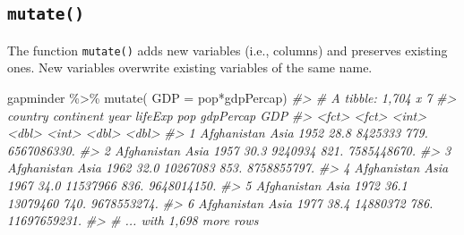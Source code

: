 \documentclass[
]{book}
\newenvironment{Shaded}{\begin{snugshade}}{\end{snugshade}}
\newcommand{\AttributeTok}[1]{\textcolor[rgb]{0.77,0.63,0.00}{#1}}
\newcommand{\CommentTok}[1]{\textcolor[rgb]{0.56,0.35,0.01}{\textit{#1}}}
\newcommand{\FunctionTok}[1]{\textcolor[rgb]{0.00,0.00,0.00}{#1}}
\newcommand{\NormalTok}[1]{#1}
\newcommand{\SpecialCharTok}[1]{\textcolor[rgb]{0.00,0.00,0.00}{#1}}
\begin{document}
\hypertarget{mutate}{%
\subsection*{\texorpdfstring{\texttt{mutate()}}{mutate()}}\label{mutate}}

The function \texttt{mutate()} adds new variables (i.e., columns) and preserves existing ones.
New variables overwrite existing variables of the same name.

\begin{Shaded}
\begin{Highlighting}[]
\NormalTok{gapminder }\SpecialCharTok{\%\textgreater{}\%} \FunctionTok{mutate}\NormalTok{( }\AttributeTok{GDP =}\NormalTok{ pop}\SpecialCharTok{*}\NormalTok{gdpPercap)}
\CommentTok{\#\textgreater{} \# A tibble: 1,704 x 7}
\CommentTok{\#\textgreater{}   country     continent  year lifeExp      pop gdpPercap          GDP}
\CommentTok{\#\textgreater{}   \textless{}fct\textgreater{}       \textless{}fct\textgreater{}     \textless{}int\textgreater{}   \textless{}dbl\textgreater{}    \textless{}int\textgreater{}     \textless{}dbl\textgreater{}        \textless{}dbl\textgreater{}}
\CommentTok{\#\textgreater{} 1 Afghanistan Asia       1952    28.8  8425333      779.  6567086330.}
\CommentTok{\#\textgreater{} 2 Afghanistan Asia       1957    30.3  9240934      821.  7585448670.}
\CommentTok{\#\textgreater{} 3 Afghanistan Asia       1962    32.0 10267083      853.  8758855797.}
\CommentTok{\#\textgreater{} 4 Afghanistan Asia       1967    34.0 11537966      836.  9648014150.}
\CommentTok{\#\textgreater{} 5 Afghanistan Asia       1972    36.1 13079460      740.  9678553274.}
\CommentTok{\#\textgreater{} 6 Afghanistan Asia       1977    38.4 14880372      786. 11697659231.}
\CommentTok{\#\textgreater{} \# ... with 1,698 more rows}
\end{Highlighting}
\end{Shaded}
\end{document}
